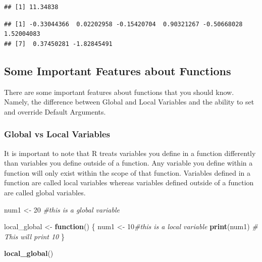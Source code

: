 \documentclass[
]{book}
\newenvironment{Shaded}{\begin{snugshade}}{\end{snugshade}}
\newcommand{\CommentTok}[1]{\textcolor[rgb]{0.56,0.35,0.01}{\textit{#1}}}
\newcommand{\ControlFlowTok}[1]{\textcolor[rgb]{0.13,0.29,0.53}{\textbf{#1}}}
\newcommand{\DecValTok}[1]{\textcolor[rgb]{0.00,0.00,0.81}{#1}}
\newcommand{\FunctionTok}[1]{\textcolor[rgb]{0.13,0.29,0.53}{\textbf{#1}}}
\newcommand{\NormalTok}[1]{#1}
\newcommand{\OtherTok}[1]{\textcolor[rgb]{0.56,0.35,0.01}{#1}}
\newcommand{\SpecialCharTok}[1]{\textcolor[rgb]{0.81,0.36,0.00}{\textbf{#1}}}
\begin{document}
\begin{verbatim}
## [1] 11.34838
\end{verbatim}

\begin{Shaded}
\end{Shaded}

\begin{verbatim}
## [1] -0.33044366  0.02202958 -0.15420704  0.90321267 -0.50668028  1.52004083
## [7]  0.37450281 -1.82845491
\end{verbatim}

\hypertarget{some-important-features-about-functions}{%
\subsection{Some Important Features about Functions}\label{some-important-features-about-functions}}

There are some important features about functions that you should know. Namely, the difference between Global and Local Variables and the ability to set and override Default Arguments.

\hypertarget{global-vs-local-variables}{%
\subsubsection{Global vs Local Variables}\label{global-vs-local-variables}}

It is important to note that R treats variables you define in a function differently than variables you define outside of a function. Any variable you define within a function will only exist within the scope of that function. Variables defined in a function are called local variables whereas variables defined outside of a function are called global variables.

\begin{Shaded}
\begin{Highlighting}[]
\NormalTok{num1 }\OtherTok{\textless{}{-}} \DecValTok{20} \CommentTok{\#this is a global variable}

\NormalTok{local\_global }\OtherTok{\textless{}{-}} \ControlFlowTok{function}\NormalTok{() \{}
\NormalTok{  num1 }\OtherTok{\textless{}{-}} \DecValTok{10}\CommentTok{\#this is a local variable}
  \FunctionTok{print}\NormalTok{(num1)  }\CommentTok{\# This will print 10}
\NormalTok{\}}

\FunctionTok{local\_global}\NormalTok{()}
\end{Highlighting}
\end{Shaded}
\end{document}
